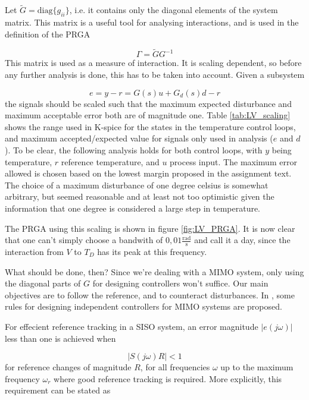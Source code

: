 \documentclass[12pt]{article}
\begin{document}
Let $\tilde{G} = \textrm{diag}\{g_{ii}\}$, i.e. it contains only the diagonal elements of the system matrix. This matrix is a useful tool for analysing interactions, and is used in the definition of the PRGA

\begin{equation}
\Gamma = \tilde{G} G^{-1}
\end{equation}
This matrix is used as a measure of interaction. It is scaling dependent, so before any further analysis is done, this has to be taken into account. Given a subsystem

\begin{equation}
e = y - r = G(s) u + G_d(s) d - r
\end{equation}
the signals should be scaled such that the maximum expected disturbance and maximum acceptable error both are of magnitude one. Table \ref{tab:LV_scaling} shows the range used in K-spice for the states in the temperature control loops, and maximum accepted/expected value for signals only used in analysis ($e$ and $d$). To be clear, the following analysis holds for both control loops, with $y$ being temperature, $r$ reference temperature, and $u$ process input. The maximum error allowed is chosen based on the lowest margin proposed in the assignment text. The choice of a maximum disturbance of one degree celsius is somewhat arbitrary, but seemed reasonable and at least not too optimistic given the information that one degree is considered a large step in temperature.

The PRGA using this scaling is shown in figure \ref{fig:LV_PRGA}. It is now clear that one can't simply choose a bandwith of $0,01 \frac{\textrm{rad}}{\textrm{s}}$ and call it a day, since the interaction from $V$ to $T_D$ has its peak at this frequency.

What should be done, then? Since we're dealing with a MIMO system, only using the diagonal parts of $G$ for designing controllers won't suffice. Our main objectives are to follow the reference, and to counteract disturbances. In \cite{skogestad}, some rules for designing independent controllers for MIMO systems are proposed. 

For effecient reference tracking in a SISO system, an error magnitude $| e(j \omega) |$ less than one is achieved when

\begin{equation}
| S(j \omega) R | < 1
\end{equation}
for reference changes of magnitude $R$, for all frequencies $\omega$ up to the maximum frequency $\omega_r$ where good reference tracking is required. More explicitly, this requirement can be stated as
\end{document}
